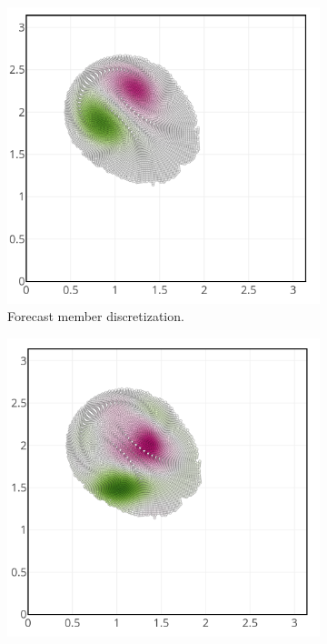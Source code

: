 \begin{figure}[h!]
	\centering
	\begin{subfigure}{0.32\textwidth}
		\centering
		\includegraphics[width=\linewidth]{./images/app2d/assim_member_forecast.png}
		\caption{Forecast member discretization.}
	\end{subfigure}
	\hfill
	\begin{subfigure}{0.32\textwidth}
		\centering
		\includegraphics[width=\linewidth]{./images/app2d/assim_member_ppf.png}

\end{subfigure}
\end{figure}

